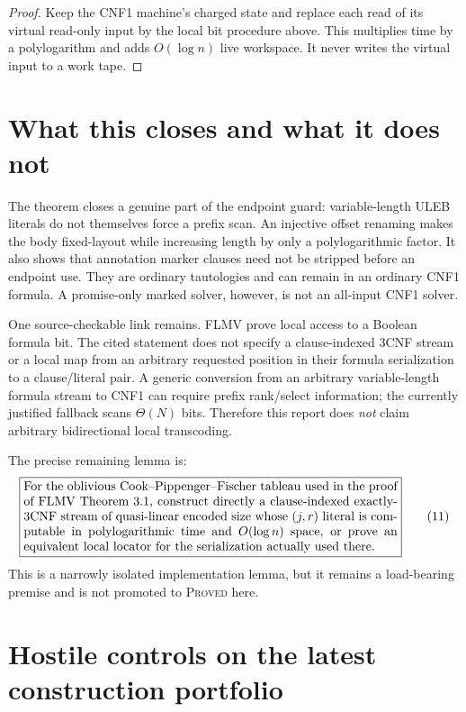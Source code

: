 \documentclass[11pt]{article}
\begin{document}
\begin{proof}
Keep the CNF1 machine's charged state and replace each read of its virtual
read-only input by the local bit procedure above.  This multiplies time by a
polylogarithm and adds $O(\log n)$ live workspace.  It never writes the
virtual input to a work tape.
\end{proof}

\section{What this closes and what it does not}

The theorem closes a genuine part of the endpoint guard: variable-length
ULEB literals do not themselves force a prefix scan.  An injective offset
renaming makes the body fixed-layout while increasing length by only a
polylogarithmic factor.  It also shows that annotation marker clauses need
not be stripped before an endpoint use.  They are ordinary tautologies and
can remain in an ordinary CNF1 formula.  A promise-only marked solver,
however, is not an all-input CNF1 solver.

One source-checkable link remains.  FLMV prove local access to a Boolean
formula bit.  The cited statement does not specify a clause-indexed 3CNF
stream or a local map from an arbitrary requested position in their formula
serialization to a clause/literal pair.  A generic conversion from an
arbitrary variable-length formula stream to CNF1 can require prefix
rank/select information; the currently justified fallback scans
$\Theta(N)$ bits.  Therefore this report does \emph{not} claim arbitrary
bidirectional local transcoding.

The precise remaining lemma is:
\[
\boxed{\begin{minipage}{0.86\linewidth}
For the oblivious Cook--Pippenger--Fischer tableau used in the proof of
FLMV Theorem~3.1, construct directly a clause-indexed exactly-3CNF stream of
quasi-linear encoded size whose $(j,r)$ literal is computable in
polylogarithmic time and $O(\log n)$ space, or prove an equivalent local
locator for the serialization actually used there.
\end{minipage}}                                               \tag{11}
\]
This is a narrowly isolated implementation lemma, but it remains a
load-bearing premise and is not promoted to \textsc{Proved} here.

\section{Hostile controls on the latest construction portfolio}
\end{document}
